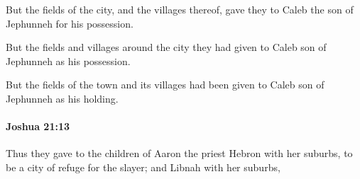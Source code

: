 			\begin{versebox}
					\item[BHS] 
					\item[ASV] But the fields of the city, and the villages thereof, gave they to Caleb the son of Jephunneh for his possession.
					\item[NIV] But the fields and villages around the city they had given to Caleb son of Jephunneh as his possession.
					\item[NRSV] But the fields of the town and its villages had been given to Caleb son of Jephunneh as his holding.
			\end{versebox}

		\paragraph{Joshua 21:13} %
			\label{JOSHUA-21-13}

			Thus they gave to the children of Aaron the priest Hebron with her suburbs, to be a city of refuge for the slayer; and Libnah with her suburbs,

